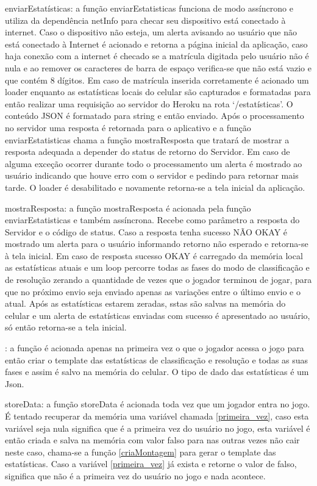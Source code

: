 enviarEstatísticas: a função enviarEstatisticas funciona de modo assíncrono e utiliza da dependência netInfo para checar seu dispositivo está conectado à internet. Caso o dispositivo não esteja, um alerta avisando ao usuário que não está conectado à Internet é acionado e retorna a página inicial da aplicação, caso haja conexão com a internet é checado se a matrícula digitada pelo usuário não é nula e ao remover os caracteres de barra de espaço verifica-se que não está vazio e que contém 8 dígitos. Em caso de matrícula inserida corretamente é acionado um loader enquanto as estatísticas locais do celular são capturados e formatadas para então realizar uma requisição ao servidor do Heroku na rota ‘/estatísticas’. O conteúdo JSON é formatado para string e então enviado. Após o processamento no servidor uma resposta é retornada para o aplicativo e a função enviarEstatisticas chama a função mostraResposta que tratará de mostrar a resposta adequada a depender do status de retorno do Servidor. Em caso de alguma exceção ocorrer durante todo o processamento um alerta é mostrado ao usuário indicando que houve erro com o servidor e pedindo para retornar mais tarde. O loader é desabilitado e novamente retorna-se a tela inicial da aplicação.

mostraResposta: a função mostraResposta é acionada pela função enviarEstatisticas e também assíncrona. Recebe como parâmetro a resposta do Servidor e o código de status. Caso a resposta tenha sucesso NÃO OKAY é mostrado um alerta para o usuário informando retorno não esperado e retorna-se à tela inicial. Em caso de resposta sucesso OKAY é carregado da memória local as estatísticas atuais e um loop percorre todas as fases do modo de classificação e de resolução zerando a quantidade de vezes que o jogador terminou de jogar, para que no próximo envio seja enviado apenas as variações entre o último envio e o atual. Após as estatísticas estarem zeradas, sstas são salvas na memória do celular e um alerta de estatísticas enviadas com sucesso é apresentado ao usuário, só então retorna-se a tela inicial.

\label{criaMontagem}: a função é acionada apenas na primeira vez o que o jogador acessa o jogo para então criar o template das estatísticas de classificação e resolução e todas as suas fases e assim é salvo na memória do celular. O tipo de dado das estatísticas é um Json.

storeData: a função storeData é acionada toda vez que um jogador entra no jogo. É tentado recuperar da memória uma variável chamada \ref{primeira_vez}, caso esta variável seja nula significa que é a primeira vez do usuário no jogo, esta variável é então criada e salva na memória com valor falso para nas outras vezes não cair neste caso, chama-se a função \ref{criaMontagem} para gerar o template das estatísticas. Caso a variável \ref{primeira_vez} já exista e retorne o valor de falso, significa que não é a primeira vez do usuário no jogo e nada acontece.

